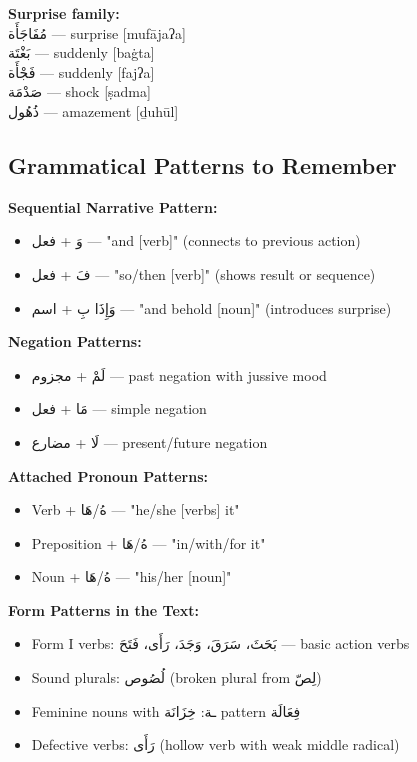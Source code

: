 \documentclass[letterpaper,12pt]{article}
\begin{document}
\begin{multicols}{2}
\textbf{Surprise family:}\\
\textarabic{مُفَاجَأَة} — surprise [mufājaʔa]\\
\textarabic{بَغْتَة} — suddenly [baġta]\\
\textarabic{فَجْأَة} — suddenly [fajʔa]\\
\textarabic{صَدْمَة} — shock [ṣadma]\\
\textarabic{ذُهُول} — amazement [ḏuhūl]
\end{multicols}

\subsection{Grammatical Patterns to Remember}

\textbf{Sequential Narrative Pattern:}
\begin{itemize}
\item \textarabic{وَ + فعل} — "and [verb]" (connects to previous action)
\item \textarabic{فَ + فعل} — "so/then [verb]" (shows result or sequence)  
\item \textarabic{وَإِذَا بِ + اسم} — "and behold [noun]" (introduces surprise)
\end{itemize}

\textbf{Negation Patterns:}
\begin{itemize}
\item \textarabic{لَمْ + مجزوم} — past negation with jussive mood
\item \textarabic{مَا + فعل} — simple negation
\item \textarabic{لَا + مضارع} — present/future negation
\end{itemize}

\textbf{Attached Pronoun Patterns:}
\begin{itemize}
\item Verb + \textarabic{هُ/هَا} — "he/she [verbs] it"
\item Preposition + \textarabic{هُ/هَا} — "in/with/for it"
\item Noun + \textarabic{هُ/هَا} — "his/her [noun]"
\end{itemize}

\textbf{Form Patterns in the Text:}
\begin{itemize}
\item Form I verbs: \textarabic{بَحَثَ، سَرَقَ، وَجَدَ، رَأَى، فَتَحَ} — basic action verbs
\item Sound plurals: \textarabic{لُصُوص} (broken plural from \textarabic{لِصّ})
\item Feminine nouns with \textarabic{ـة}: \textarabic{خِزَانَة} pattern \textarabic{فِعَالَة}
\item Defective verbs: \textarabic{رَأَى} (hollow verb with weak middle radical)
\end{itemize}
\end{document}
